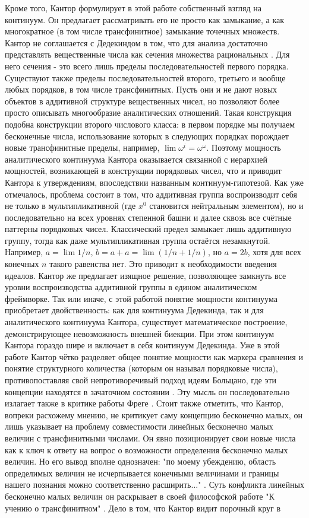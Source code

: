 \documentclass[12pt]{article}
\begin{document}
Кроме того, Кантор формулирует в этой работе собственный взгляд на континуум. Он предлагает рассматривать его не просто как замыкание, а как многократное (в том числе трансфинитное) замыкание точечных множеств. Кантор не соглашается с Дедекиндом в том, что для анализа достаточно представлять вещественные числа как сечения множества рациональных \cite{cantor-objection-to-dedekind}. Для него сечения - это всего лишь пределы последовательностей первого порядка. Существуют также пределы последовательностей второго, третьего и вообще любых порядков, в том числе трансфинитных. Пусть они и не дают новых объектов в аддитивной структуре вещественных чисел, но позволяют более просто описывать многообразие аналитических отношений. Такая конструкция подобна конструкции второго числового класса: в первом порядке мы получаем бесконечные числа, использование которых в следующих порядках порождает новые трансфинитные пределы, например, $\lim \omega^i = \omega^\omega$. Поэтому мощность аналитического континуума Кантора оказывается связанной с иерархией мощностей, возникающей в конструкции порядковых чисел, что и приводит Кантора к утверждениям, впоследствии названным континуум-гипотезой. Как уже отмечалось, проблема состоит в том, что аддитивная группа воспроизводит себя не только в мультипликативной (где $x^0$ становится нейтральным элементом), но и последовательно на всех уровнях степенной башни и далее сквозь все счётные паттерны порядковых чисел. Классический предел замыкает лишь аддитивную группу, тогда как даже мультипликативная группа остаётся незамкнутой. Например, $a = \lim 1/n$, $b = a + a = \lim (1/n + 1/n)$, но $a = 2b$, хотя для всех конечных $n$ такого равенства нет. Это приводит к необходимости введения идеалов. Кантор же предлагает изящное решение, позволяющее замкнуть все уровни воспроизводства аддитивной группы в едином аналитическом фреймворке. Так или иначе, с этой работой понятие мощности континуума приобретает двойственность: как для континуума Дедекинда, так и для аналитического континуума Кантора, существует математическое построение, демонстрирующее невозможность внешней биекции. При этом континуум Кантора гораздо шире и включает в себя континуум Дедекинда. Уже в этой работе Кантор чётко разделяет общее понятие мощности как маркера сравнения и понятие структурного количества (которым он называл порядковые числа), противопоставляя свой непротиворечивый подход идеям Больцано, где эти концепции находятся в зачаточном состоянии \cite{cantor-bolzano}. Эту мысль он последовательно излагает также в критике работы Фреге \cite{cantor-frege}. Стоит также отметить, что Кантор, вопреки расхожему мнению, не критикует саму концепцию бесконечно малых, он лишь указывает на проблему совместимости линейных бесконечно малых величин с трансфинитными числами. Он явно позиционирует свои новые числа как к ключ к ответу на вопрос о возможности определения бесконечно малых величин. Но его вывод вполне однозначен: "по моему убеждению, область определимых величин не исчерпывается конечными величинами и границы нашего познания можно соответственно расширить..." \cite{cantor-infinitesimal}. Суть конфликта линейных бесконечно малых величин он раскрывает в своей философской работе "К учению о трансфинитном" \cite{cantor-infinitesimal-problem}. Дело в том, что Кантор видит порочный круг в 
\end{document}
